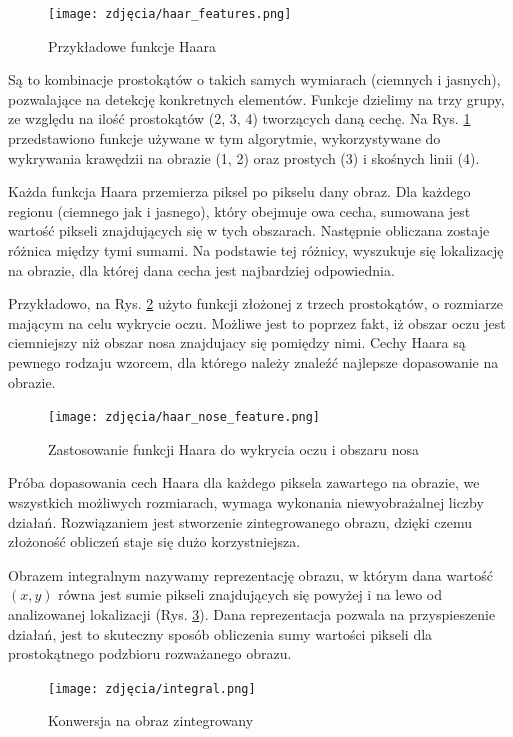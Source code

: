 \begin{figure}[h]
	\centering
	\texttt{[image: zdjęcia/haar\_features.png]}
	\caption{Przykładowe funkcje Haara \cite{haarCascade}} 
	\label{fig:haarFeatures}
\end{figure}

Są to kombinacje prostokątów  o takich samych wymiarach (ciemnych i jasnych), pozwalające na detekcję konkretnych elementów. Funkcje dzielimy na trzy grupy, ze względu na ilość prostokątów (2, 3, 4) tworzących daną cechę. Na Rys. \ref{fig:haarFeatures} przedstawiono funkcje używane w tym algorytmie, wykorzystywane do wykrywania krawędzii na obrazie (1, 2) oraz prostych (3) i skośnych linii (4).

Każda funkcja Haara przemierza piksel po pikselu dany obraz. Dla każdego regionu (ciemnego jak i jasnego), który obejmuje owa cecha, sumowana jest wartość pikseli znajdujących się w tych obszarach. Następnie obliczana zostaje różnica między tymi sumami. Na podstawie tej różnicy, wyszukuje się lokalizację na obrazie, dla której dana cecha jest najbardziej odpowiednia. 

Przykładowo, na Rys. \ref{fig:haarNose} użyto funkcji złożonej z trzech prostokątów, o rozmiarze mającym na celu wykrycie oczu. Możliwe jest to poprzez fakt, iż obszar oczu jest ciemniejszy niż obszar nosa znajdujacy się pomiędzy nimi. Cechy Haara są pewnego rodzaju wzorcem, dla którego należy znaleźć najlepsze dopasowanie na obrazie.
 
\begin{figure}[h]
	\centering
	\texttt{[image: zdjęcia/haar\_nose\_feature.png]}
	\caption{Zastosowanie funkcji Haara do wykrycia oczu i obszaru nosa \cite{haar}} 
	\label{fig:haarNose}
\end{figure}

Próba dopasowania cech Haara dla każdego piksela zawartego na obrazie, we wszystkich możliwych rozmiarach, wymaga wykonania niewyobrażalnej liczby działań. Rozwiązaniem jest stworzenie zintegrowanego obrazu, dzięki czemu złożoność obliczeń staje się dużo korzystniejsza.

Obrazem integralnym nazywamy reprezentację obrazu, w którym dana wartość $(x, y)$ równa jest sumie pikseli znajdujących się powyżej i na lewo od analizowanej lokalizacji (Rys. \ref{fig:integralImage}). Dana reprezentacja pozwala na przyspieszenie działań, jest to skuteczny sposób obliczenia sumy wartości pikseli dla prostokątnego podzbioru rozważanego obrazu.
 
 \begin{figure}[h]
	\centering
	\texttt{[image: zdjęcia/integral.png]}
	\caption{Konwersja na obraz zintegrowany \cite{haarCascade}} 
	\label{fig:integralImage}
\end{figure}
 
